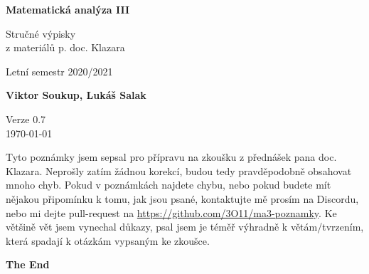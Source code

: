 \documentclass[11pt]{article}
\theoremstyle{nontheoremstyle}
\theoremstyle{nontheoremstylenodot}
\theoremstyle{theoremstyle}
\begin{document}
\begin{titlepage}
    \begin{center}
        \vspace*{1cm}

        \Huge
        \textbf{Matematická analýza III}

        \vspace{0.5cm}
        \LARGE
        Stručné výpisky
        \\

        z materiálů p. doc. Klazara

        \vspace{5mm}

        Letní semestr 2020/2021
        
        \vspace{1.5cm}

        \textbf{Viktor Soukup, Lukáš Salak}

        \vfill
        \flushright
        \normalsize
        Verze 0.7\\
        \today

    \end{center}
\end{titlepage}

Tyto poznámky jsem sepsal pro přípravu na zkoušku z přednášek pana doc. Klazara.
Neprošly zatím žádnou korekcí, budou tedy pravděpodobně obsahovat mnoho chyb.
Pokud v poznámkách najdete chybu, nebo pokud budete mít nějakou připomínku k tomu,
jak jsou psané, kontaktujte mě prosím na Discordu, nebo mi dejte pull-request na
\url{https://github.com/3O11/ma3-poznamky}. Ke většině vět jsem vynechal důkazy,
psal jsem je téměř výhradně k větám/tvrzením, která spadají k otázkám vypsaným ke zkoušce.
\clearpage

\tableofcontents
\clearpage







\vfill
\begin{center}
\LARGE
\textbf{The End}
\end{center}
\end{document}
